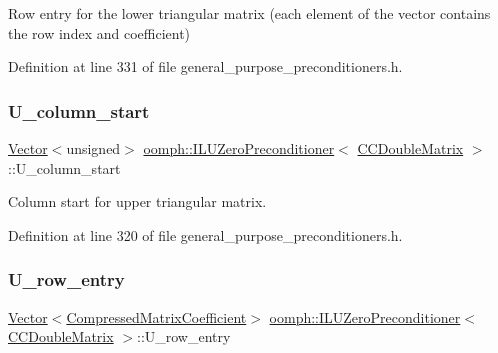 Row entry for the lower triangular matrix (each element of the vector contains the row index and coefficient) 



Definition at line 331 of file general\+\_\+purpose\+\_\+preconditioners.\+h.

\mbox{\label{classoomph_1_1ILUZeroPreconditioner_3_01CCDoubleMatrix_01_4_af67b6823d2b1bf0e4448405fd0e924bb}} 
\subsubsection{\texorpdfstring{U\+\_\+column\+\_\+start}{U\_column\_start}}
{\footnotesize\ttfamily \hyperlink{classoomph_1_1Vector}{Vector}$<$unsigned$>$ \hyperlink{classoomph_1_1ILUZeroPreconditioner}{oomph\+::\+I\+L\+U\+Zero\+Preconditioner}$<$ \hyperlink{classoomph_1_1CCDoubleMatrix}{C\+C\+Double\+Matrix} $>$\+::U\+\_\+column\+\_\+start\hspace{0.3cm}{\ttfamily [private]}}



Column start for upper triangular matrix. 



Definition at line 320 of file general\+\_\+purpose\+\_\+preconditioners.\+h.

\mbox{\label{classoomph_1_1ILUZeroPreconditioner_3_01CCDoubleMatrix_01_4_a4bcf8f5d9db565fbdb394f2efb2c6d1d}} 
\subsubsection{\texorpdfstring{U\+\_\+row\+\_\+entry}{U\_row\_entry}}
{\footnotesize\ttfamily \hyperlink{classoomph_1_1Vector}{Vector}$<$\hyperlink{classoomph_1_1CompressedMatrixCoefficient}{Compressed\+Matrix\+Coefficient}$>$ \hyperlink{classoomph_1_1ILUZeroPreconditioner}{oomph\+::\+I\+L\+U\+Zero\+Preconditioner}$<$ \hyperlink{classoomph_1_1CCDoubleMatrix}{C\+C\+Double\+Matrix} $>$\+::U\+\_\+row\+\_\+entry\hspace{0.3cm}{\ttfamily [private]}}



